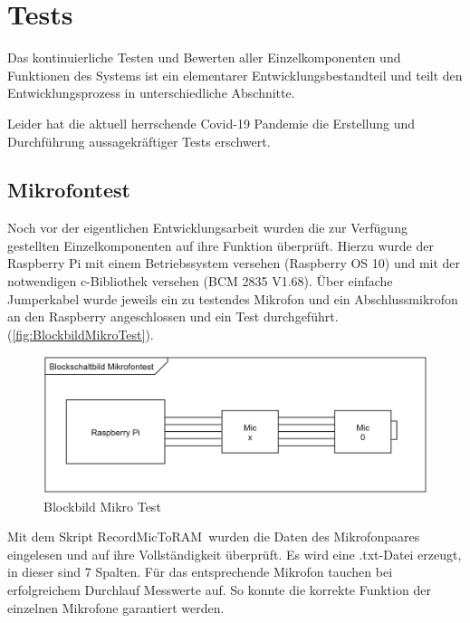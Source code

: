 \section{Tests}

Das kontinuierliche Testen und Bewerten aller Einzelkomponenten und Funktionen des Systems ist ein elementarer Entwicklungsbestandteil und teilt den Entwicklungsprozess in unterschiedliche Abschnitte.

Leider hat die aktuell herrschende Covid-19 Pandemie die Erstellung und Durchführung aussagekräftiger Tests erschwert. 

\subsection{Mikrofontest}

Noch vor der eigentlichen Entwicklungsarbeit wurden die zur Verfügung gestellten Einzelkomponenten auf ihre Funktion überprüft. Hierzu wurde der Raspberry Pi mit einem Betriebssystem versehen (Raspberry OS 10) und mit der notwendigen c-Bibliothek versehen (BCM 2835 V1.68). Über einfache Jumperkabel wurde jeweils ein zu testendes Mikrofon und ein Abschlussmikrofon an den Raspberry angeschlossen und ein Test durchgeführt. (\autoref{fig:BlockbildMikroTest}).

\begin{figure}[!h]
	\begin{center}
		\includegraphics[scale=0.2]{Sections/Tests/BlockbildMikroTest}
	\end{center}
	\caption{Blockbild Mikro Test}
	\label{fig:BlockbildMikroTest}
\end{figure}

Mit dem Skript \glqq RecordMicToRAM\grqq\ wurden die Daten des Mikrofonpaares eingelesen und auf ihre Vollständigkeit überprüft. Es wird eine .txt-Datei erzeugt, in dieser sind 7 Spalten. Für das entsprechende Mikrofon tauchen bei erfolgreichem Durchlauf Messwerte auf. So konnte die korrekte Funktion der einzelnen Mikrofone garantiert werden.

